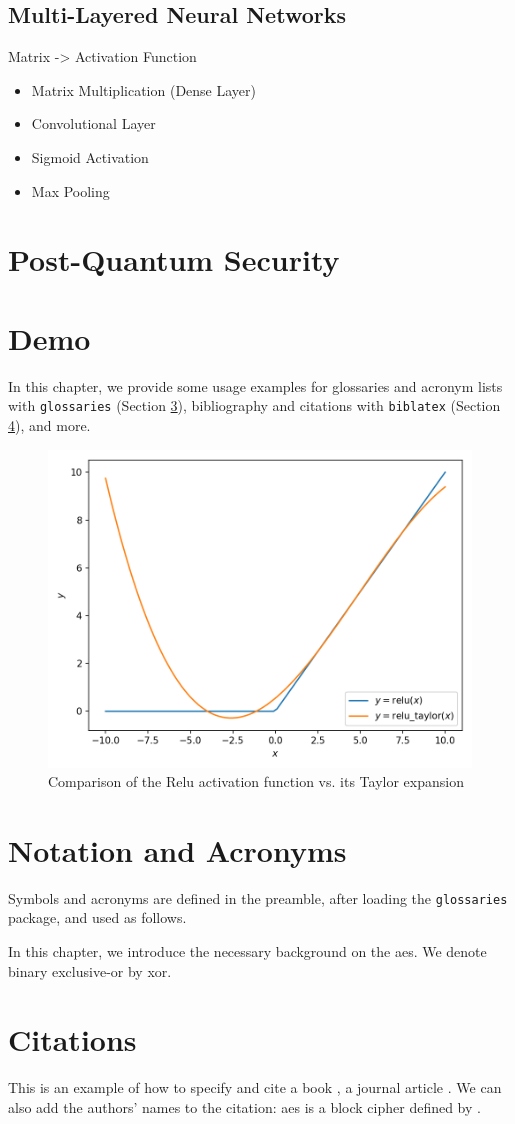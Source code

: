 \subsection{Multi-Layered Neural Networks}
Matrix -> Activation Function
\begin{itemize}
    \item Matrix Multiplication (Dense Layer)
    \item Convolutional Layer
    \item Sigmoid Activation
    \item Max Pooling
\end{itemize}

\section{Post-Quantum Security}

\section{Demo}
In this chapter, we provide some usage examples for
glossaries and acronym lists with \texttt{glossaries} (Section \ref{sec:gloss}),
bibliography and citations with \texttt{biblatex} (Section \ref{sec:bib}), and more.

\begin{figure}[H]
    \centering
    \includegraphics[width=0.8\linewidth]{figures/taylor-relu.png}
    \caption{Comparison of the Relu activation function vs. its Taylor expansion}
\end{figure}

\section{Notation and Acronyms}
\label{sec:gloss}
Symbols and acronyms are defined in the preamble, after loading the \texttt{glossaries} package, and used as follows.

In this chapter, we introduce the necessary background on the \gls{aes}.
We denote binary exclusive-or by \gls{xor}.

\section{Citations}
\label{sec:bib}
This is an example of how to specify and cite
a book \cite{AESbook},
a journal article \cite{bstjShannon49}.
We can also add the authors' names to the citation:
\Gls{aes} is a block cipher defined by \textcite{AESbook}.
